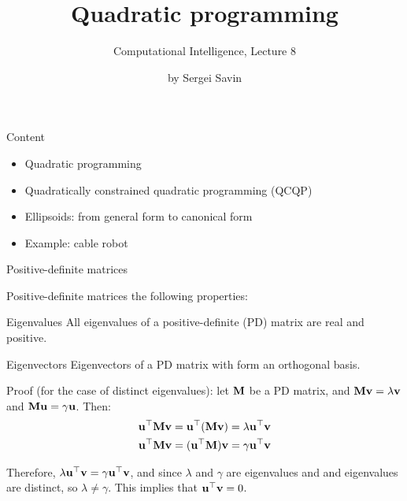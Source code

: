 \documentclass{beamer}
\title{Quadratic programming}
\subtitle{Computational Intelligence, Lecture 8}
\author{by Sergei Savin}
\date{\mydate}
\begin{document}
\maketitle


\begin{frame}{Content}

\begin{itemize}
\item  Quadratic programming
\item  Quadratically constrained quadratic programming (QCQP)
\item  Ellipsoids: from general form to canonical form
\item  Example: cable robot
\end{itemize}

\end{frame}




\begin{frame}{Positive-definite matrices}
	\begin{flushleft}
		
		Positive-definite matrices the following properties:
		
		\begin{block}{Eigenvalues}
			All eigenvalues of a positive-definite (PD) matrix are real and positive.
		\end{block}
	
		\begin{block}{Eigenvectors}
			Eigenvectors of a PD matrix with form an orthogonal basis.
		\end{block}
	
		Proof (for the case of distinct eigenvalues): let $\mathbf{M}$ be a PD matrix, and $\mathbf{M}\mathbf{v} = \lambda \mathbf{v}$ and  $\mathbf{M}\mathbf{u} = \gamma \mathbf{u}$. Then:
		\begin{align}
			\mathbf{u}^\top\mathbf{M}\mathbf{v} = \mathbf{u}^\top(\mathbf{M}\mathbf{v})= \lambda \mathbf{u}^\top \mathbf{v} \\
			\mathbf{u}^\top\mathbf{M}\mathbf{v} = (\mathbf{u}^\top\mathbf{M})\mathbf{v}= \gamma \mathbf{u}^\top \mathbf{v}
		\end{align}
		
		Therefore, $ \lambda \mathbf{u}^\top \mathbf{v}= \gamma \mathbf{u}^\top \mathbf{v}$, and since $\lambda$ and $ \gamma$ are eigenvalues and and eigenvalues are distinct, so $\lambda \neq \gamma$. This implies that $\mathbf{u}^\top \mathbf{v} = 0$.
		
	\end{flushleft}
\end{frame}
\end{document}
